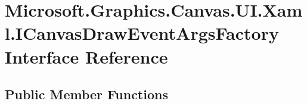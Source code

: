 \hypertarget{interface_microsoft_1_1_graphics_1_1_canvas_1_1_u_i_1_1_xaml_1_1_i_canvas_draw_event_args_factory}{}\section{Microsoft.\+Graphics.\+Canvas.\+U\+I.\+Xaml.\+I\+Canvas\+Draw\+Event\+Args\+Factory Interface Reference}
\label{interface_microsoft_1_1_graphics_1_1_canvas_1_1_u_i_1_1_xaml_1_1_i_canvas_draw_event_args_factory}
\subsection*{Public Member Functions}
